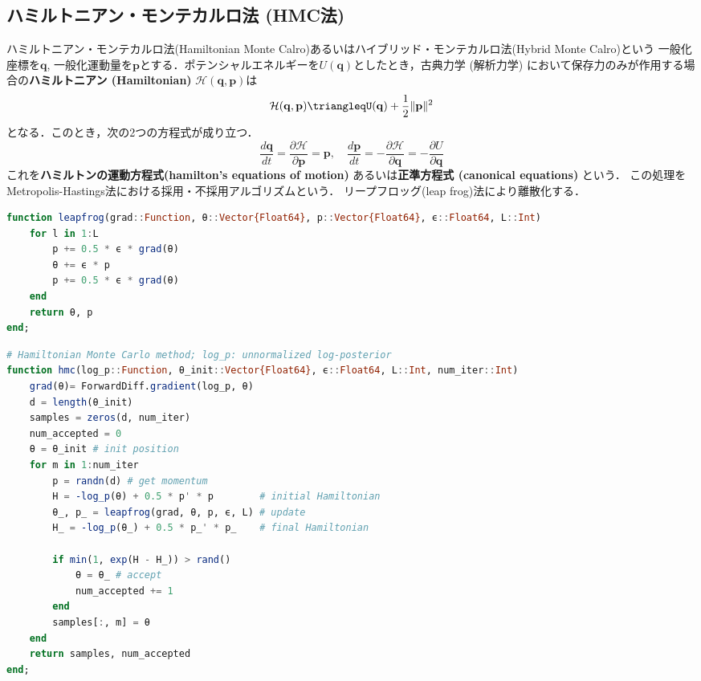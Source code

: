 \subsection{ハミルトニアン・モンテカルロ法 (HMC法)}
ハミルトニアン・モンテカルロ法(Hamiltonian Monte Calro)あるいはハイブリッド・モンテカルロ法(Hybrid Monte Calro)という
一般化座標を$\mathbf{q}$, 一般化運動量を$\mathbf{p}$とする．ポテンシャルエネルギーを$U(\mathbf{q})$としたとき，古典力学 (解析力学) において保存力のみが作用する場合の\textbf{ハミルトニアン (Hamiltonian)} $\mathcal{H}(\mathbf{q}, \mathbf{p})$は
\begin{equation}
\mathcal{H}(\mathbf{q}, \mathbf{p})\triangleqU(\mathbf{q})+\frac{1}{2}\|\mathbf{p}\|^2
\end{equation}
となる．このとき，次の2つの方程式が成り立つ．
\begin{equation}
\frac{d\mathbf{q}}{dt}=\frac{\partial \mathcal{H}}{\partial \mathbf{p}}=\mathbf{p},\quad\frac{d\mathbf{p}}{dt}=-\frac{\partial \mathcal{H}}{\partial \mathbf{q}}=-\frac{\partial U}{\partial \mathbf{q}}
\end{equation}
これを\textbf{ハミルトンの運動方程式(hamilton's equations of motion)} あるいは\textbf{正準方程式 (canonical equations)} という．
この処理をMetropolis-Hastings法における採用・不採用アルゴリズムという．
リープフロッグ(leap frog)法により離散化する．
\begin{lstlisting}[language=julia]
function leapfrog(grad::Function, θ::Vector{Float64}, p::Vector{Float64}, ϵ::Float64, L::Int)
    for l in 1:L
        p += 0.5 * ϵ * grad(θ)
        θ += ϵ * p
        p += 0.5 * ϵ * grad(θ)
    end
    return θ, p
end;
\end{lstlisting}
\begin{lstlisting}[language=julia]
# Hamiltonian Monte Carlo method; log_p: unnormalized log-posterior
function hmc(log_p::Function, θ_init::Vector{Float64}, ϵ::Float64, L::Int, num_iter::Int)
    grad(θ)= ForwardDiff.gradient(log_p, θ)
    d = length(θ_init)
    samples = zeros(d, num_iter)
    num_accepted = 0
    θ = θ_init # init position
    for m in 1:num_iter
        p = randn(d) # get momentum        
        H = -log_p(θ) + 0.5 * p' * p        # initial Hamiltonian
        θ_, p_ = leapfrog(grad, θ, p, ϵ, L) # update
        H_ = -log_p(θ_) + 0.5 * p_' * p_    # final Hamiltonian
        
        if min(1, exp(H - H_)) > rand()
            θ = θ_ # accept
            num_accepted += 1
        end
        samples[:, m] = θ
    end
    return samples, num_accepted
end;
\end{lstlisting}
